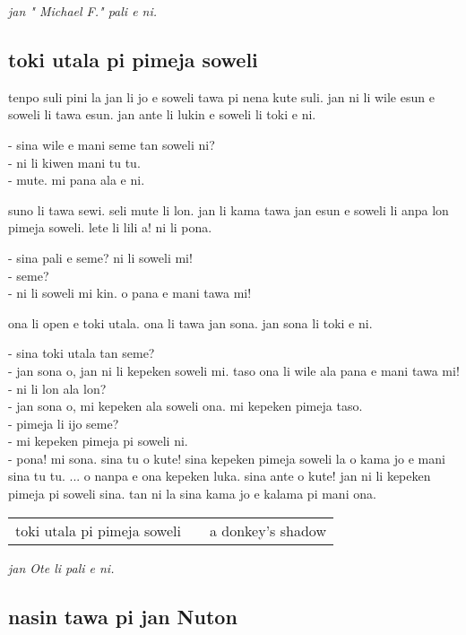 \textit{jan " Michael F."   pali e ni. \cite{www:failbluedot:01}}
%
\subsection{toki utala pi pimeja soweli}

tenpo suli pini la jan li jo e soweli tawa pi nena kute suli.
jan ni li wile esun e soweli li tawa esun.
jan ante li lukin e soweli li toki e ni.

- sina wile e mani seme tan soweli ni? \\
- ni li kiwen mani tu tu. \\
- mute. mi pana ala e ni. 

suno li tawa sewi.
seli mute li lon.
jan li kama tawa jan esun e soweli li anpa lon pimeja soweli.
lete li lili a!
ni li pona.

- sina pali e seme? ni li soweli mi! \\
- seme?          \\
- ni li soweli mi kin. o pana e mani tawa mi!

ona li open e toki utala. ona li tawa jan sona. jan sona li toki e ni.

- sina toki utala tan seme? \\
- jan sona o, jan ni li kepeken soweli mi. taso ona li wile ala pana e mani tawa mi! \\
- ni li lon ala lon? \\
- jan sona o, mi kepeken ala soweli ona. mi kepeken pimeja taso. \\
- pimeja li ijo seme? \\
- mi kepeken pimeja pi soweli ni. \\
- pona! mi sona. sina tu o kute! sina kepeken pimeja soweli la o kama jo e mani sina tu tu. ...
o nanpa e ona kepeken luka. sina ante o kute! jan ni li kepeken pimeja pi soweli sina. tan ni la sina kama jo e kalama pi mani ona.

\begin{supertabular}{p{5,5cm}|ll}
toki utala pi pimeja soweli && a donkey's shadow \\
\end{supertabular}

\textit{jan Ote li pali e ni. \cite{www:olukin:01}}
%
\newpage
\subsection{nasin tawa pi jan Nuton}

